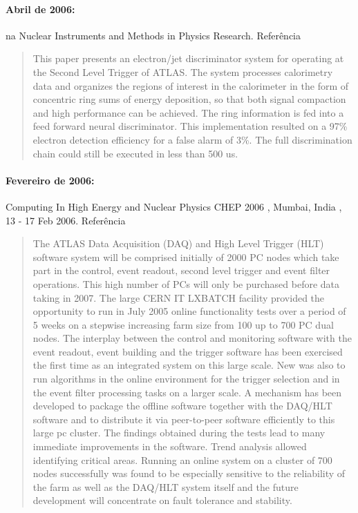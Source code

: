 \paragraph{Abril de 2006: } na Nuclear Instruments and Methods
in Physics Research. Referência~\cite{aa:nim-06}

\begin{quotation}
This paper presents an electron/jet discriminator system for operating at the
Second Level Trigger of ATLAS. The system processes calorimetry data and
organizes the regions of interest in the calorimeter in the form of concentric
ring sums of energy deposition, so that both signal compaction and high
performance can be achieved. The ring information is fed into a feed forward
neural discriminator. This implementation resulted on a 97\% electron
detection efficiency for a false alarm of 3\%. The full discrimination chain
could still be executed in less than 500 us.
\end{quotation}

\paragraph{Fevereiro de 2006: }
Computing In High Energy and Nuclear Physics  CHEP 2006 , Mumbai, India , 13 -
17 Feb 2006. Referência~\cite{aa:chep-06-01}

\begin{quotation}
The ATLAS Data Acquisition (DAQ) and High Level Trigger (HLT) software system
will be comprised initially of 2000 PC nodes which take part in the control,
event readout, second level trigger and event filter operations. This high
number of PCs will only be purchased before data taking in 2007. The large
CERN IT LXBATCH facility provided the opportunity to run in July 2005 online
functionality tests over a period of 5 weeks on a stepwise increasing farm
size from 100 up to 700 PC dual nodes. The interplay between the control and
monitoring software with the event readout, event building and the trigger
software has been exercised the first time as an integrated system on this
large scale. New was also to run algorithms in the online environment for the
trigger selection and in the event filter processing tasks on a larger
scale. A mechanism has been developed to package the offline software together
with the DAQ/HLT software and to distribute it via peer-to-peer software
efficiently to this large pc cluster. The findings obtained during the tests
lead to many immediate improvements in the software. Trend analysis allowed
identifying critical areas. Running an online system on a cluster of 700 nodes
successfully was found to be especially sensitive to the reliability of the
farm as well as the DAQ/HLT system itself and the future development will
concentrate on fault tolerance and stability.
\end{quotation}

